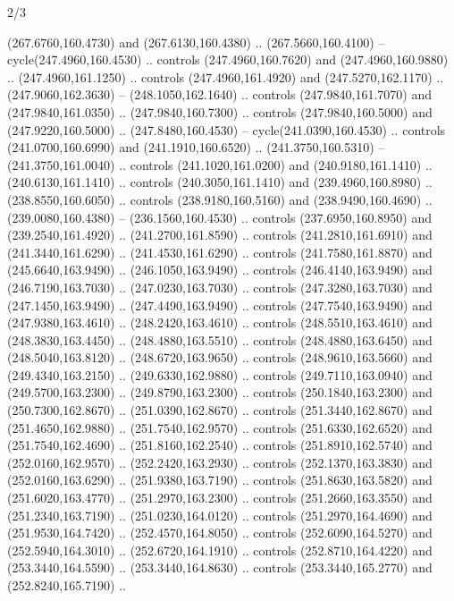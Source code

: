 \begin{flagdescription}{2/3}
\begin{scope}[xshift=0.5\flaglength,yshift=0.5\flagwidth,scale=\flagwidth/259.2]
\begin{scope}[y=0.8pt, x=0.8pt, yscale=-1,shift={(-243,-162)}]
      (267.6760,160.4730) and (267.6130,160.4380) .. (267.5660,160.4100) --
      cycle(247.4960,160.4530) .. controls (247.4960,160.7620) and
      (247.4960,160.9880) .. (247.4960,161.1250) .. controls (247.4960,161.4920) and
      (247.5270,162.1170) .. (247.9060,162.3630) -- (248.1050,162.1640) .. controls
      (247.9840,161.7070) and (247.9840,161.0350) .. (247.9840,160.7300) .. controls
      (247.9840,160.5000) and (247.9220,160.5000) .. (247.8480,160.4530) --
      cycle(241.0390,160.4530) .. controls (241.0700,160.6990) and
      (241.1910,160.6520) .. (241.3750,160.5310) -- (241.3750,161.0040) .. controls
      (241.1020,161.0200) and (240.9180,161.1410) .. (240.6130,161.1410) .. controls
      (240.3050,161.1410) and (239.4960,160.8980) .. (238.8550,160.6050) .. controls
      (238.9180,160.5160) and (238.9490,160.4690) .. (239.0080,160.4380) --
      (236.1560,160.4530) .. controls (237.6950,160.8950) and (239.2540,161.4920) ..
      (241.2700,161.8590) .. controls (241.2810,161.6910) and (241.3440,161.6290) ..
      (241.4530,161.6290) .. controls (241.7580,161.8870) and (245.6640,163.9490) ..
      (246.1050,163.9490) .. controls (246.4140,163.9490) and (246.7190,163.7030) ..
      (247.0230,163.7030) .. controls (247.3280,163.7030) and (247.1450,163.9490) ..
      (247.4490,163.9490) .. controls (247.7540,163.9490) and (247.9380,163.4610) ..
      (248.2420,163.4610) .. controls (248.5510,163.4610) and (248.3830,163.4450) ..
      (248.4880,163.5510) .. controls (248.4880,163.6450) and (248.5040,163.8120) ..
      (248.6720,163.9650) .. controls (248.9610,163.5660) and (249.4340,163.2150) ..
      (249.6330,162.9880) .. controls (249.7110,163.0940) and (249.5700,163.2300) ..
      (249.8790,163.2300) .. controls (250.1840,163.2300) and (250.7300,162.8670) ..
      (251.0390,162.8670) .. controls (251.3440,162.8670) and (251.4650,162.9880) ..
      (251.7540,162.9570) .. controls (251.6330,162.6520) and (251.7540,162.4690) ..
      (251.8160,162.2540) .. controls (251.8910,162.5740) and (252.0160,162.9570) ..
      (252.2420,163.2930) .. controls (252.1370,163.3830) and (252.0160,163.6290) ..
      (251.9380,163.7190) .. controls (251.8630,163.5820) and (251.6020,163.4770) ..
      (251.2970,163.2300) .. controls (251.2660,163.3550) and (251.2340,163.7190) ..
      (251.0230,164.0120) .. controls (251.2970,164.4690) and (251.9530,164.7420) ..
      (252.4570,164.8050) .. controls (252.6090,164.5270) and (252.5940,164.3010) ..
      (252.6720,164.1910) .. controls (252.8710,164.4220) and (253.3440,164.5590) ..
      (253.3440,164.8630) .. controls (253.3440,165.2770) and (252.8240,165.7190) ..

\end{scope}
\end{scope}
\end{flagdescription}
